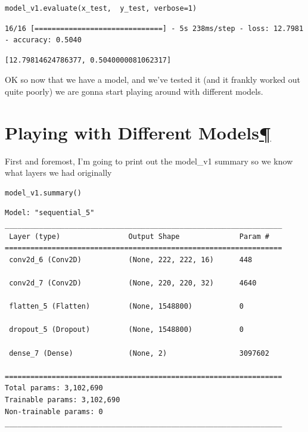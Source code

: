 \documentclass[
]{article}
\begin{document}
\begin{Verbatim}[frame=single]
model_v1.evaluate(x_test,  y_test, verbose=1)
\end{Verbatim}

\begin{verbatim}
16/16 [==============================] - 5s 238ms/step - loss: 12.7981 - accuracy: 0.5040
\end{verbatim}

\begin{verbatim}
[12.79814624786377, 0.5040000081062317]
\end{verbatim}

OK so now that we have a model, and we've tested it (and it frankly
worked out quite poorly) we are gonna start playing around with
different models.

\hypertarget{Playing-with-Different-Models}{%
\section{\texorpdfstring{Playing with Different
Models\protect\hyperlink{Playing-with-Different-Models}{¶}}{Playing with Different Models¶}}\label{Playing-with-Different-Models}}

First and foremost, I'm going to print out the model\_v1 summary so we
know what layers we had originally

\begin{Verbatim}[frame=single]
model_v1.summary()
\end{Verbatim}

\begin{Verbatim}
Model: "sequential_5"
_________________________________________________________________
 Layer (type)                Output Shape              Param #   
=================================================================
 conv2d_6 (Conv2D)           (None, 222, 222, 16)      448       
                                                                 
 conv2d_7 (Conv2D)           (None, 220, 220, 32)      4640      
                                                                 
 flatten_5 (Flatten)         (None, 1548800)           0         
                                                                 
 dropout_5 (Dropout)         (None, 1548800)           0         
                                                                 
 dense_7 (Dense)             (None, 2)                 3097602   
                                                                 
=================================================================
Total params: 3,102,690
Trainable params: 3,102,690
Non-trainable params: 0
_________________________________________________________________
\end{Verbatim}
\end{document}
